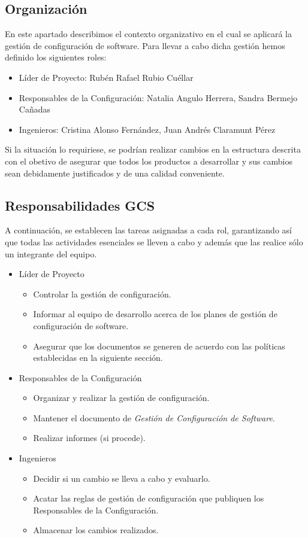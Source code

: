 \documentclass[11pt, a4paper, twoside, titlepage]{article}
\begin{document}
		\subsection{Organización}
			En este apartado describimos el contexto organizativo en el cual se aplicará la gestión de configuración de software. Para llevar a cabo dicha gestión hemos definido los siguientes roles:
			\begin{itemize}
				\item Líder de Proyecto: Rubén Rafael Rubio Cuéllar
				\item Responsables de la Configuración: Natalia Angulo Herrera, Sandra Bermejo Cañadas
				\item Ingenieros: Cristina Alonso Fernández, Juan Andrés Claramunt Pérez
			\end{itemize}
			Si la situación lo requiriese, se podrían realizar cambios en la estructura descrita con el obetivo de asegurar que todos los productos a desarrollar y sus cambios sean debidamente justificados y de una calidad conveniente.
		\subsection{Responsabilidades GCS}
			A continuación, se establecen las tareas asignadas a cada rol, garantizando así que todas las actividades esenciales se lleven a cabo y además que las realice sólo un integrante del equipo.
			\begin{itemize}
				\item Líder de Proyecto
					\begin{itemize}
						\item Controlar la gestión de configuración.
						\item Informar al equipo de desarrollo acerca de los planes de gestión de configuración de software.
						\item Asegurar que los documentos se generen de acuerdo con las políticas establecidas en la siguiente sección.
					\end{itemize}
				\item Responsables de la Configuración
					\begin{itemize}
						\item Organizar y realizar la gestión de configuración.
						\item Mantener el documento de \textit{Gestión de Configuración de Software}.
						\item Realizar informes (si procede).
					\end{itemize}
				\item Ingenieros
					\begin{itemize}
						\item Decidir si un cambio se lleva a cabo y evaluarlo.
						\item Acatar las reglas de gestión de configuración que publiquen los  Responsables de la Configuración.
						\item Almacenar los cambios realizados.
					\end{itemize}
			\end{itemize}
\end{document}
